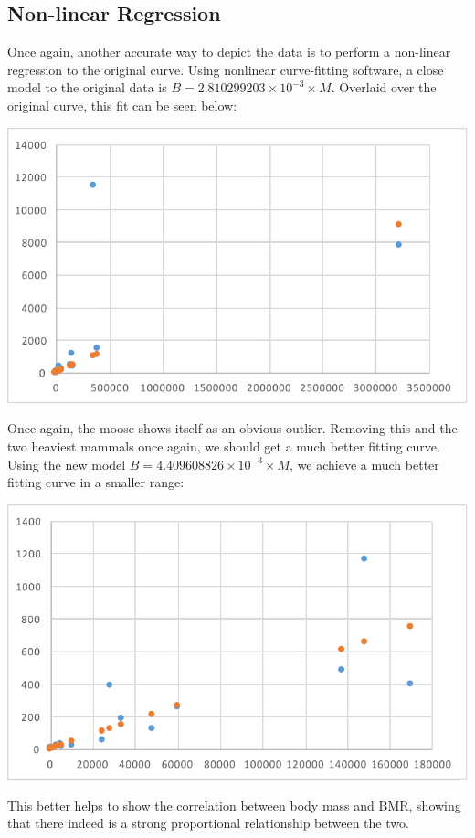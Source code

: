 \documentclass[10pt,letterpaper]{article}
\begin{document}
		\subsection{Non-linear Regression}
			Once again, another accurate way to depict the data is to perform a non-linear regression to the original curve. Using nonlinear curve-fitting software, a close model to the original data is $B =2.810299203 \times 10^{-3} \times M$. Overlaid over the original curve, this fit can be seen below:
			\newline \newline
			\centerline{\includegraphics{Picture13.pdf}}
			\newline \newline
			Once again, the moose shows itself as an obvious outlier. Removing this and the two heaviest mammals once again, we should get a much better fitting curve. Using the new model $B = 4.409608826 \times 10^{-3} \times M$, we achieve a much better fitting curve in a smaller range: 
			\newline \newline
			\centerline{\includegraphics{Picture14.pdf}}
			\newline \newline
			This better helps to show the correlation between body mass and BMR, showing that there indeed is a strong proportional relationship between the two.
\end{document}
